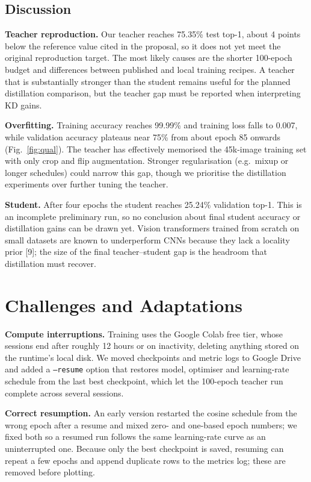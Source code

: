 \documentclass[11pt, letterpaper]{article}
\begin{document}
\subsection{Discussion}

\textbf{Teacher reproduction.} Our teacher reaches 75.35\% test top-1, about 4
points below the reference value cited in the proposal, so it does not yet
meet the original reproduction target. The most likely causes are the shorter
100-epoch budget and differences between published and local training recipes.
A teacher that is substantially stronger than the student remains useful for
the planned distillation comparison, but the teacher gap must be reported when
interpreting KD gains.

\textbf{Overfitting.} Training accuracy reaches 99.99\% and training loss falls
to 0.007, while validation accuracy plateaus near 75\% from about epoch 85
onwards (Fig.~\ref{fig:qual}). The teacher has effectively memorised the
45k-image training set with only crop and flip augmentation. Stronger
regularisation (e.g.\ mixup or longer schedules) could narrow this gap, though
we prioritise the distillation experiments over further tuning the teacher.

\textbf{Student.} After four epochs the student reaches 25.24\% validation
top-1. This is an incomplete preliminary run, so no conclusion about final
student accuracy or distillation gains can be drawn yet.
Vision transformers trained from scratch on small datasets are known to
underperform CNNs because they lack a locality prior [9]; the size of the
final teacher--student gap is the headroom that distillation must recover.

\section{Challenges and Adaptations}

\textbf{Compute interruptions.} Training uses the Google Colab free tier, whose
sessions end after roughly 12 hours or on inactivity, deleting anything stored
on the runtime's local disk. We moved checkpoints and metric logs to Google
Drive and added a \texttt{--resume} option that restores model, optimiser and
learning-rate schedule from the last best checkpoint, which let the 100-epoch
teacher run complete across several sessions.

\textbf{Correct resumption.} An early version restarted the cosine schedule from
the wrong epoch after a resume and mixed zero- and one-based epoch numbers; we
fixed both so a resumed run follows the same learning-rate curve as an
uninterrupted one. Because only the best checkpoint is saved, resuming can
repeat a few epochs and append duplicate rows to the metrics log; these are
removed before plotting.
\end{document}
